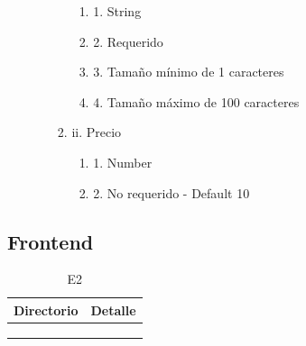 \begin{enumerate}
\begin{enumerate}
\begin{enumerate}
\begin{enumerate}
                    \item 1. String
                    \item 2. Requerido
                    \item 3. Tamaño mínimo de 1 caracteres
                    \item 4. Tamaño máximo de 100 caracteres
                \end{enumerate}
            \item  ii. Precio
                \begin{enumerate}
                    \item 1. Number
                    \item 2. No requerido - Default 10
                \end{enumerate}
           \end{enumerate}
    \end{enumerate}    
\end{enumerate}

\subsection{Frontend}

 \begin{table}[H]
    \begin{center}
        \begin{tabular}{ | m{2cm} | m{8cm} | }
            \hline \textbf{Directorio} & \textbf{Detalle }\\ \hline
             &    \\ \hline
            &    \\ \hline    
            &    \\ \hline   
        \end{tabular}
        \caption{E2}
    \end{center}
\end{table}